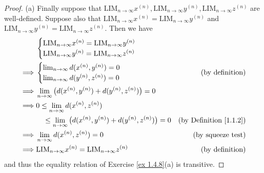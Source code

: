 \begin{proof}{(a)}
    Finally suppose that \(\text{LIM}_{n \to \infty} x^{(n)}, \text{LIM}_{n \to \infty} y^{(n)}, \text{LIM}_{n \to \infty} z^{(n)}\) are well-defined.
    Suppose also that \(\text{LIM}_{n \to \infty} x^{(n)} = \text{LIM}_{n \to \infty} y^{(n)}\) and \(\text{LIM}_{n \to \infty} y^{(n)} = \text{LIM}_{n \to \infty} z^{(n)}\).
    Then we have
    \begin{align*}
                 & \begin{cases}
                       \text{LIM}_{n \to \infty} x^{(n)} = \text{LIM}_{n \to \infty} y^{(n)} \\
                       \text{LIM}_{n \to \infty} y^{(n)} = \text{LIM}_{n \to \infty} z^{(n)}
                   \end{cases}                                                       \\
        \implies & \begin{cases}
                       \lim_{n \to \infty} d(x^{(n)}, y^{(n)}) = 0 \\
                       \lim_{n \to \infty} d(y^{(n)}, z^{(n)}) = 0
                   \end{cases}                                         & \text{(by definition)}                                                \\
        \implies & \lim_{n \to \infty} \big(d(x^{(n)}, y^{(n)}) + d(y^{(n)}, z^{(n)})\big) = 0                                                 \\
        \implies & 0 \leq \lim_{n \to \infty} d(x^{(n)}, z^{(n)})                                                                              \\
                 & \quad \leq \lim_{n \to \infty} \big(d(x^{(n)}, y^{(n)}) + d(y^{(n)}, z^{(n)})\big) = 0 & \text{(by Definition \ref{1.1.2})} \\
        \implies & \lim_{n \to \infty} d(x^{(n)}, z^{(n)}) = 0                                            & \text{(by squeeze test)}           \\
        \implies & \text{LIM}_{n \to \infty} x^{(n)} = \text{LIM}_{n \to \infty} z^{(n)}                  & \text{(by definition)}
    \end{align*}
    and thus the equality relation of Exercise \ref{ex 1.4.8}(a) is transitive.
\end{proof}

